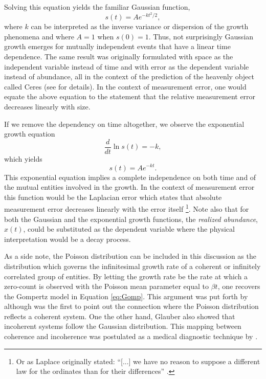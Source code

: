 \documentclass{article}
\begin{document}
Solving this equation yields the familiar Gaussian function, 
\begin{equation}
  s(t) = A e^{ - k t^2 / 2},
\end{equation}
where $k$ can be interpreted as the inverse variance or dispersion of the growth phenomena and where $A=1$ when $s(0)=1$. Thus, not surprisingly Gaussian growth emerges for mutually independent events that have a linear time dependence. The same result was originally formulated with space as the independent variable instead of time and with error as the dependent variable instead of abundance, all in the context of the prediction of the heavenly object called Ceres \cite{gauss1857theory} (see \cite{stahl2006evolution} for details). In the context of measurement error, one would equate the above equation to the statement that the relative measurement error decreases linearly with size. 

If we remove the dependency on time altogether, we observe the exponential growth equation
\begin{equation}
  \frac{d}{dt}\ln s(t) = - k,
\end{equation}
which yields 
\begin{equation}
  s(t) = A e^{ - k t}.
\end{equation}
This exponential equation implies a complete independence on both time and of the mutual entities involved in the growth. In the context of measurement error this function would be the Laplacian error which states that absolute measurement error decreases linearly with the error itself \footnote{Or as Laplace originally stated: ``[...] we have no reason to suppose a different law for the ordinates than for their differences'' \cite{stahl2006evolution}.}. Note also that for both the Gaussian and the exponential growth functions, the \textit{realized abundance}, $x(t)$, could be substituted as the dependent variable where the physical interpretation would be a decay process.

As a side note, the Poisson distribution can be included in this discussion as the distribution which governs the infinitesimal growth rate of a coherent or infinitely correlated group of entities. By letting the growth rate be the rate at which a zero-count is observed with the Poisson mean parameter equal to $\beta t$, one recovers the Gompertz model in Equation \ref{eq:Gomp}. This argument was put forth by \citet{shklovskii2005simple} although \citet{glauber1963coherent} was the first to point out the connection where the Poisson distribution reflects a coherent system. One the other hand, Glauber also showed that incoherent systems follow the Gaussian distribution. This mapping between coherence and incoherence was postulated as a medical diagnostic technique by \citet{zhang1994log}.
\end{document}
